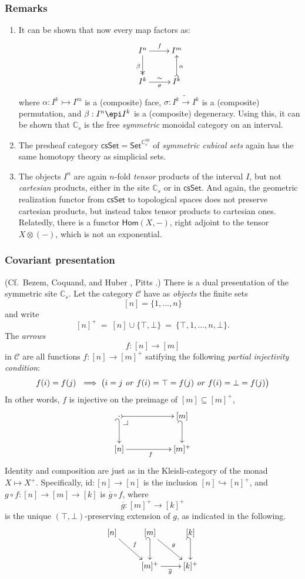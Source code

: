 \documentclass[11pt]{article}
\makeatletter
\newcommand{\C}{\ensuremath{\mathbb{C}}}
\newcommand{\psh}[1]{\ensuremath{\mathsf{Set}^{#1^{\mathrm{op}}}}}
\newcommand{\pbcorner}[1][dr]{\save*!/#1-1.2pc/#1:(-1,1)@^{|-}\restore}
\newcommand{\hook}{\ensuremath{\hookrightarrow}}
\theoremstyle{remark}
\theoremstyle{definition}
\makeatother
\begin{document}
\subsubsection*{Remarks}
\begin{enumerate}
\item It can be shown that now every map factors as:
\[
\xymatrix{
 I^n \ar[r]^{f} \ar@{->>}[d]_{\beta} & I^m\\
I^k \ar[r]^{\sim}_{\sigma} & I^k \ar@{>->}[u]_{\alpha}
}
\]
where $\alpha : I^k \rightarrowtail I^m$ is a (composite) face, $\sigma : I^k \tilde{\to} I^k$ is a (composite) permutation, and $\beta : I^n \epi I^k$ is a (composite) degeneracy.  Using this, it can be shown that $\mathbb{C}_s$ is the free \emph{symmetric} monoidal category on an interval.

\item The presheaf category $\mathsf{csSet} = \psh{\C_s}$ of \emph{symmetric cubical sets} again has the same homotopy theory as simplicial sets.

\item The objects $I^n$ are again  $n$-fold \emph{tensor} products of the interval $I$, but not  \emph{cartesian} products, either in the site $\C_s$ or in  $\mathsf{csSet}$.   And again, the geometric realization functor from $\mathsf{csSet}$ to topological spaces does not preserve cartesian products, but instead takes tensor products to cartesian ones. Relatedly, there is a functor $\mathsf{Hom}(X, - )$, right adjoint to the tensor $X\otimes (-)$, which is not an exponential.
\end{enumerate}

\subsubsection*{Covariant presentation}

(Cf.\ Bezem, Coquand, and Huber \cite{BCH}, Pitts \cite{Pitts}.) There is a dual presentation of the symmetric site $\C_s$.  Let the category $\mathcal{C}$ have as \emph{objects} the finite sets $$[n]= \{1, ..., n\}$$ and write 
\[
[n]^+\ =\  [n] \cup \{\top, \bot\}\ =\ \{\top, 1, ..., n, \bot\}.
\]
The \emph{arrows}
\[
f : [n] \to [m]
\]
in $\mathcal{C}$ are all functions  $f : [n] \to [m]^+$ satifying the following \emph{partial injectivity condition}:
\[
f(i)= f(j)\ \implies \big(i = j\ \text{\emph{or}}\ f(i) = \top = f(j)\ \text{\emph{or}}\  f(i) = \bot = f(j) \big)
\]
In other words, $f$ is injective on the preimage of  $[m] \subseteq [m]^+$,
\[
\xymatrix{
\cdot \ar@{_{(}->}[d] \ar@{>->}[rr] \pbcorner && [m] \ar@{_{(}->}[d] \\
[n] \ar[rr]_{f} && [m]^+
}
\]
Identity and composition are just as in the Kleisli-category of the monad $X\mapsto X^+$.  Specifically, $\mathrm{id}: [n] \to [n]$ is the inclusion $[n] \hook [n]^+$, and $g\circ f : [n] \to [m] \to [k]$ is $\overline{g}\circ f$, where $$\overline{g}:[m]^+\to[k]^+$$ is the unique $(\top, \bot)$-preserving extension of $g$, as indicated in the following.
\[
\xymatrix{
[n] \ar[rd]^{f} & [m] \ar@{_{(}->}[d] \ar[rd]^{g} & [k] \ar@{_{(}->}[d] \\
		& [m]^+\ar[r]_{\overline{g}} & [k]^+
}
\]
\end{document}
